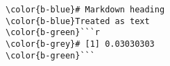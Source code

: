 \documentclass[class=minimal,border=0]{standalone}
\begin{document}
%
\begin{BVerbatim}[bgcolor=b-darkgrey]
\color{b-blue}# Markdown heading
\color{b-blue}Treated as text
\color{b-green}```r
\color{b-grey}# [1] 0.03030303
\color{b-green}```



\end{BVerbatim}
\end{document}
